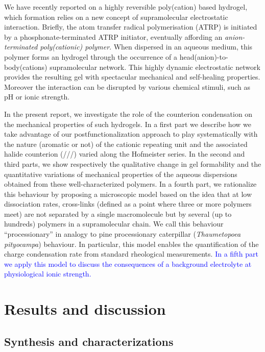 \documentclass[twoside,twocolumn,9pt]{article}
\begin{document}
We have recently reported on a highly reversible poly(cation) based hydrogel\cite{Srour2014}, which formation relies on a new concept of supramolecular  electrostatic interaction. Briefly, the atom transfer radical polymerisation (ATRP) is initiated by a phosphonate-terminated ATRP initiator, eventually affording an \emph{anion-terminated poly(cationic) polymer}. When dispersed in an aqueous medium, this polymer forms an hydrogel through the occurrence of a head(anion)-to-body(cations) supramolecular network. This highly dynamic electrostatic network provides the resulting gel with spectacular mechanical and self-healing properties. Moreover the interaction can be disrupted by various chemical stimuli, such as pH or ionic strength.

In the present report, we investigate the role of the counterion condensation on the mechanical properties of such hydrogels. In a first part we describe how we take advantage of our postfunctionalization approach to play systematically with the nature (aromatic or not) of the cationic repeating unit and the associated halide counterion (///) varied along the Hofmeister series. In the second and third parts, we show respectively the qualitative change in gel formability and the quantitative variations of mechanical properties of the aqueous dispersions obtained from these well-characterized polymers. In a fourth part, we rationalize this behaviour by proposing a microscopic model based on the idea that at low dissociation rates, cross-links (defined as a point where three or more polymers meet) are not separated by a single macromolecule but by several (up to hundreds) polymers in a supramolecular chain. We call this behaviour ``processionary'' in analogy to pine processionary caterpillar (\textit{Thaumetopoea pityocampa}) behaviour\cite{Fabre1916}. In particular, this model enables the quantification of the charge condensation rate from standard rheological measurements. \textcolor{blue}{In a fifth part we apply this model to discuss the consequences of a background electrolyte at physiological ionic strength.} %


\section{Results and discussion}

\subsection{Synthesis and characterizations}
\end{document}
